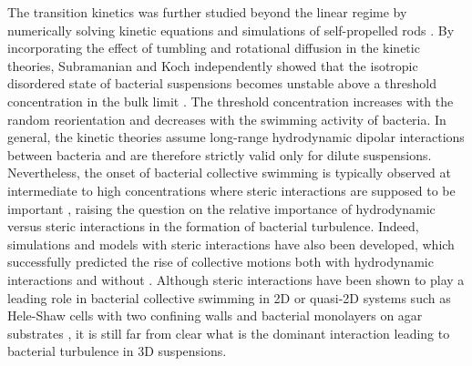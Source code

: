 The transition kinetics was further studied beyond the linear regime by numerically solving kinetic equations \cite{Saintillan2008b} and simulations of self-propelled rods \cite{Saintillan2012}.
By incorporating the effect of tumbling and rotational diffusion in the kinetic theories, Subramanian and Koch independently showed that the isotropic disordered state of bacterial suspensions becomes unstable above a threshold concentration in the bulk limit \cite{Koch2011, Subramanian2009}. The threshold concentration increases with the random reorientation and decreases with the swimming activity of bacteria. In general, the kinetic theories assume long-range hydrodynamic dipolar interactions between bacteria and are therefore strictly valid only for dilute suspensions. Nevertheless, the onset of bacterial collective swimming is typically observed at intermediate to high concentrations where steric interactions are supposed to be important \cite{Aranson2007, Ezhilan2013, Cisneros2011}, raising the question on the relative importance of hydrodynamic versus steric interactions in the formation of bacterial turbulence.
Indeed, simulations and models with steric interactions have also been developed, which successfully predicted the rise of collective motions both with hydrodynamic interactions \cite{Aranson2007, Ezhilan2013} and without \cite{Sambelashvili2007, Baskaran2010}.
Although steric interactions have been shown to play a leading role in bacterial collective swimming in 2D or quasi-2D systems such as Hele-Shaw cells with two confining walls \cite{Ishikawa2006, Nishiguchi2017} and bacterial monolayers on agar substrates \cite{Darnton2010, Zhang2010}, it is still far from clear what is the dominant interaction leading to bacterial turbulence in 3D suspensions.


